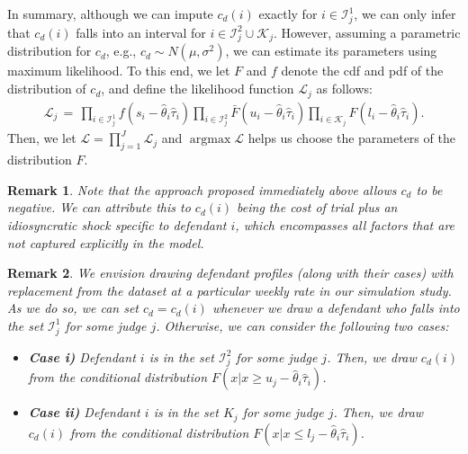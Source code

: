 \documentclass[11pt, oneside]{article}   	%
\theoremstyle{ModifiedStyle}
\newtheorem{remark}{Remark}
\DeclareMathOperator*{\argmax}{argmax}
\begin{document}
		In summary, although we can impute $c_d(i)$ exactly for $i\in\mathcal{I}_j^1$, we can only infer that $c_d(i)$ falls into an interval for $i\in\mathcal{I}^2_j\cup \mathcal{K}_j$. However, assuming a parametric distribution for $c_d$, e.g., $c_d \sim N(\mu,\sigma^2)$, we can estimate its parameters using maximum likelihood. To this end, we let $F$ and $f$ denote the cdf and pdf of the distribution of $c_d$, and define the likelihood function $\mathscr{L}_j$ as follows:
		\begin{align*}
			\mathscr{L}_j \,=\, \prod_{i\in\mathcal{I}_j^1} f(s_i-\hat{\theta}_i\hat{\tau}_i) \prod_{i\in\mathcal{I}_j^2} \bar{F}(u_i-\hat{\theta}_i\hat{\tau}_i) \prod_{i\in \mathcal{K}_j} F(l_i-\hat{\theta}_i\hat{\tau}_i).
		\end{align*}
		Then, we let $\mathscr{L} = \prod_{j=1}^J \mathscr{L}_j$ and $\argmax \mathscr{L}$ helps us choose the parameters of the distribution $F$.
		\begin{remark}
			Note that the approach proposed immediately above allows $c_d$ to be negative. We can attribute this to $c_d(i)$ being the cost of trial plus an idiosyncratic shock specific to defendant $i$, which encompasses all factors that are not captured explicitly in the model.
		\end{remark}
		\begin{remark}
			We envision drawing defendant profiles (along with their cases) with replacement from the dataset at a particular weekly rate in our simulation study. As we do so, we can set $c_d = c_d(i)$ whenever we draw a defendant who falls into the set $\mathcal{I}_j^1$ for some judge $j$. Otherwise, we can consider the following two cases:
			\begin{itemize}
				\vspace{-2mm}
				\item[] \hspace{-10mm}\textbf{Case i)} Defendant $i$ is in the set $\mathcal{I}_j^2$ for some judge $j$. Then, we draw $c_d(i)$ from the conditional distribution $F(x|x\geq u_j-\hat{\theta}_i\hat{\tau}_i)$.
				\vspace{-2mm}
				\item[] \hspace{-10mm}\textbf{Case ii)} Defendant $i$ is in the set $K_j$ for some judge $j$. Then, we draw $c_d(i)$ from the conditional distribution $F(x|x\leq l_j-\hat{\theta}_i\hat{\tau}_i)$.
			\end{itemize}
		\end{remark}
		\vspace{-3mm}
\end{document}
